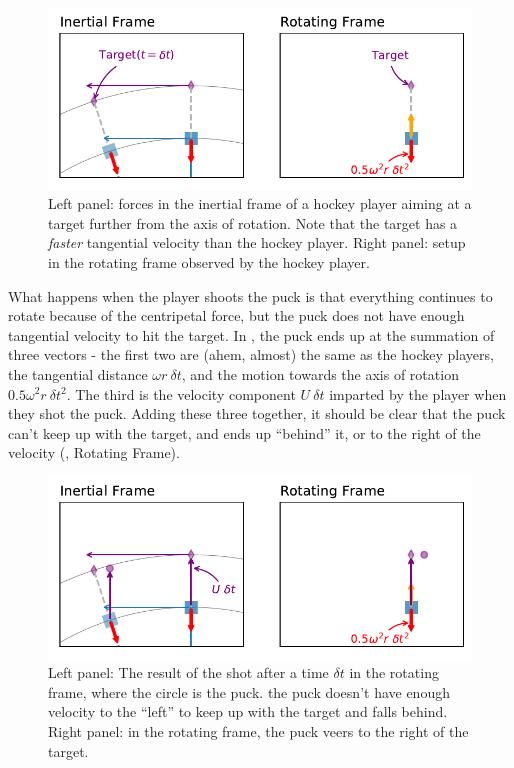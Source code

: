 \begin{figure}[hbt]
  \begin{center}
    \includegraphics{figs/Coriolis/SouthSetup}
    \caption{Left panel: forces in the inertial frame of a hockey player aiming at a target further from the axis of rotation. Note that the target has a \emph{faster} tangential velocity than the hockey player.  Right panel: setup in the rotating frame observed by the hockey player.  }
    \label{fig:SouthSetup}  
  \end{center}
\end{figure}

What happens when the player shoots the puck is that everything continues to rotate because of the centripetal force, but the puck does not have enough tangential velocity to hit the target.  In , the puck ends up at the summation of three vectors - the first two are (ahem, almost) the same as the hockey players, the tangential distance $\omega r\ \delta t$, and the motion towards the axis of rotation $0.5\omega^2 r \ \delta t^2$. The third is the velocity component $U\ \delta t$ imparted by the player when they shot the puck. Adding these three together, it should be clear that the puck can't keep up with the target, and ends up ``behind'' it, or to the right of the velocity (, Rotating Frame).  

\begin{figure}[hbt]
  \begin{center}
    \includegraphics{figs/Coriolis/SouthThrow}
    \caption{Left panel: The result of the shot after a time $\delta t$ in the rotating frame, where the circle is the puck.  the puck doesn't have enough velocity to the ``left'' to keep up with the target and falls behind.   Right panel: in the rotating frame, the puck veers to the right of the target.}
    \label{fig:SouthThrow}  
  \end{center}
\end{figure}

